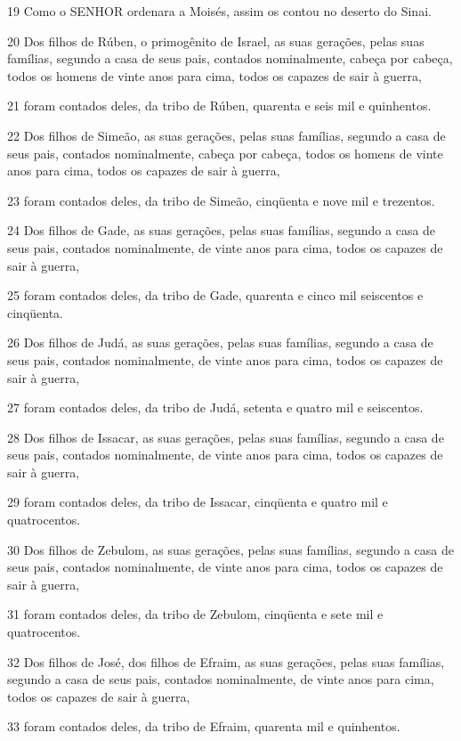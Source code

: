 \par 19 Como o SENHOR ordenara a Moisés, assim os contou no deserto do Sinai.
\par 20 Dos filhos de Rúben, o primogênito de Israel, as suas gerações, pelas suas famílias, segundo a casa de seus pais, contados nominalmente, cabeça por cabeça, todos os homens de vinte anos para cima, todos os capazes de sair à guerra,
\par 21 foram contados deles, da tribo de Rúben, quarenta e seis mil e quinhentos.
\par 22 Dos filhos de Simeão, as suas gerações, pelas suas famílias, segundo a casa de seus pais, contados nominalmente, cabeça por cabeça, todos os homens de vinte anos para cima, todos os capazes de sair à guerra,
\par 23 foram contados deles, da tribo de Simeão, cinqüenta e nove mil e trezentos.
\par 24 Dos filhos de Gade, as suas gerações, pelas suas famílias, segundo a casa de seus pais, contados nominalmente, de vinte anos para cima, todos os capazes de sair à guerra,
\par 25 foram contados deles, da tribo de Gade, quarenta e cinco mil seiscentos e cinqüenta.
\par 26 Dos filhos de Judá, as suas gerações, pelas suas famílias, segundo a casa de seus pais, contados nominalmente, de vinte anos para cima, todos os capazes de sair à guerra,
\par 27 foram contados deles, da tribo de Judá, setenta e quatro mil e seiscentos.
\par 28 Dos filhos de Issacar, as suas gerações, pelas suas famílias, segundo a casa de seus pais, contados nominalmente, de vinte anos para cima, todos os capazes de sair à guerra,
\par 29 foram contados deles, da tribo de Issacar, cinqüenta e quatro mil e quatrocentos.
\par 30 Dos filhos de Zebulom, as suas gerações, pelas suas famílias, segundo a casa de seus pais, contados nominalmente, de vinte anos para cima, todos os capazes de sair à guerra,
\par 31 foram contados deles, da tribo de Zebulom, cinqüenta e sete mil e quatrocentos.
\par 32 Dos filhos de José, dos filhos de Efraim, as suas gerações, pelas suas famílias, segundo a casa de seus pais, contados nominalmente, de vinte anos para cima, todos os capazes de sair à guerra,
\par 33 foram contados deles, da tribo de Efraim, quarenta mil e quinhentos.
